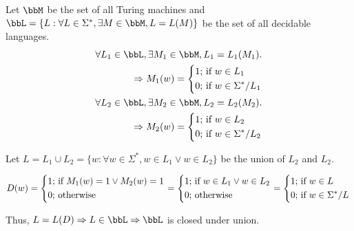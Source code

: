 \documentclass[twoside,11pt]{homework}
\begin{document}
\begin{solution}
  Let $\bbM$ be the set of all Turing machines and\\ $\bbL = \{ L : \forall L \in \Sigma^*, \exists M
  \in \bbM, L = L(M) \}$ be the set of all decidable languages.
  \[
    \begin{aligned}
      \forall L_1 \in \bbL, \exists M_1 \in \bbM, L_1 = L_1(M_1).\\
      \Rightarrow M_1(w) =
      \left\{
      \begin{aligned}
        1 ;& \text{ if } w \in L_1\\
        0 ;& \text{ if } w \in \Sigma^* / L_1
      \end{aligned}
      \right. \\
      \forall L_2 \in \bbL, \exists M_2 \in \bbM, L_2 = L_2(M_2).\\
      \Rightarrow M_2(w) =
      \left\{
      \begin{aligned}
        1 ;& \text{ if } w \in L_2\\
        0 ;& \text{ if } w \in \Sigma^* / L_2
      \end{aligned}
      \right. \\
    \end{aligned}
  \]

  Let $L = L_1 \cup L_2 = \{ w : \forall w \in \Sigma^*, w \in L_1 \lor w \in L_2\}$ be the union
  of $L_2$ and $L_2$.
  \begin{construct}
    \[
      D(w) =
      \left\{
        \begin{aligned}
          1 ; & \text{ if } M_1(w) = 1 \lor M_2(w) = 1\\
          0 ; & \text{ otherwise}
        \end{aligned}
      \right.
      =
      \left\{
        \begin{aligned}
          1 ; & \text{ if } w \in L_1 \lor w \in L_2\\
          0 ; & \text{ otherwise}
        \end{aligned}
      \right.
      =
      \left\{
        \begin{aligned}
          1 ; & \text{ if } w \in L\\
          0 ; & \text{ if } w \in \Sigma^* / L
        \end{aligned}
      \right.\\
    \]
  \end{construct}

  Thus, $L = L(D) \Rightarrow L \in \bbL \Rightarrow \bbL$ is closed under union.

\end{solution}
\end{document}
